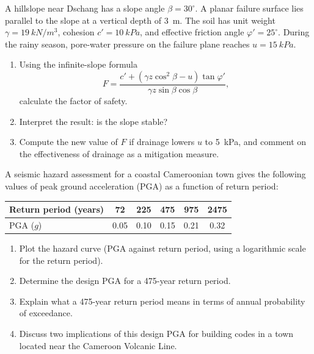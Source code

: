 \documentclass[11pt]{article}
\newcounter{popsec}
\newcounter{popsub}
\newcommand{\courssub}[1]{%
  \stepcounter{popsub}%
  \par\vspace{9pt}\noindent{\popxbold\fontsize{11.5}{13}\selectfont\color{popink}{\color{poporange}\thepopsec.\thepopsub}\hspace{6pt}#1}\par\nopagebreak\vspace{4pt}
}
\begin{document}
\courssub{I practise}

\begin{exercice}
A hillslope near Dschang has a slope angle $\beta = 30^{\circ}$. A planar failure surface lies parallel to the slope at a vertical depth of \SI{3}{m}. The soil has unit weight $\gamma = \SI{19}{kN/m^3}$, cohesion $c' = \SI{10}{kPa}$, and effective friction angle $\varphi' = 25^{\circ}$. During the rainy season, pore-water pressure on the failure plane reaches $u = \SI{15}{kPa}$.
\begin{enumerate}
\item Using the infinite-slope formula
\[ F = \frac{c' + (\gamma z \cos^2\beta - u)\tan\varphi'}{\gamma z \sin\beta \cos\beta}, \]
calculate the factor of safety.
\item Interpret the result: is the slope stable?
\item Compute the new value of $F$ if drainage lowers $u$ to \SI{5}{kPa}, and comment on the effectiveness of drainage as a mitigation measure.
\end{enumerate}
\end{exercice}

\begin{exercice}
A seismic hazard assessment for a coastal Cameroonian town gives the following values of peak ground acceleration (PGA) as a function of return period:

\begin{center}
\begin{tabular}{|l|c|c|c|c|c|}
\hline
\rowcolor{popblueL} Return period (years) & 72 & 225 & 475 & 975 & 2475 \\
\hline
PGA ($g$) & 0.05 & 0.10 & 0.15 & 0.21 & 0.32 \\
\hline
\end{tabular}
\end{center}

\begin{enumerate}
\item Plot the hazard curve (PGA against return period, using a logarithmic scale for the return period).
\item Determine the design PGA for a 475-year return period.
\item Explain what a 475-year return period means in terms of annual probability of exceedance.
\item Discuss two implications of this design PGA for building codes in a town located near the Cameroon Volcanic Line.
\end{enumerate}
\end{exercice}
\end{document}
